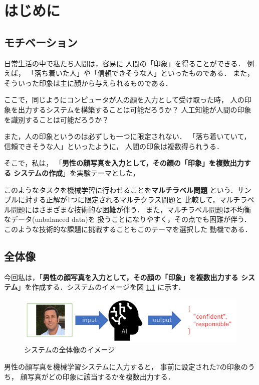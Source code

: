\chapter{はじめに}
\section{モチベーション}
日常生活の中で私たち人間は，容易に
人間の「印象」を得ることができる．
例えば，
「落ち着いた人」や「信頼できそうな人」といったものである．
また，そういった印象は主に顔から与えられるものである．

ここで，同じようにコンピュータが人の顔を入力として受け取った時，
人の印象を出力するシステムを構築することは可能だろうか？
人工知能が人間の印象を識別することは可能だろうか？

また，人の印象というのは必ずしも一つに限定されない．
「落ち着いていて，信頼できそうな人」といったように，
人間の印象は複数得られうる．

そこで，私は，
「{\bf 男性の顔写真を入力として，その顔の「印象」を複数出力する
システムの作成}」を実験テーマとした，

このようなタスクを機械学習に行わせることを{\bf マルチラベル問題}
という．サンプルに対する正解が1つに限定されるマルチクラス問題と
比較して，マルチラベル問題にはさまざまな技術的な困難が伴う．
また，マルチラベル問題は不均衡なデータ(unbalanced data)を
扱うことになりやすく，その点でも困難が伴う．
このような技術的な課題に挑戦することもこのテーマを選択した
動機である．
\section{全体像}
今回私は，「{\bf 男性の顔写真を入力として，その顔の「印象」を複数出力する
システム}」を作成する．システムのイメージを図
\ref{fig:ch1:system}
に示す．

\begin{figure}[tb]
  \centering
  \includegraphics[width=13cm]{ch1/system.png}
  \caption{
  システムの全体像のイメージ
  \label{fig:ch1:system}
  }
\end{figure}

男性の顔写真を機械学習システムに入力すると，
事前に設定された7の印象のうち，
顔写真がどの印象に該当するかを複数出力する．

